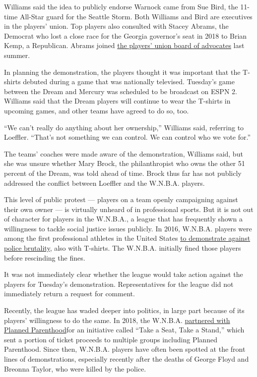 Williams said the idea to publicly endorse Warnock came from Sue Bird,
the 11-time All-Star guard for the Seattle Storm. Both Williams and Bird
are executives in the players' union. Top players also consulted with
Stacey Abrams, the Democrat who lost a close race for the Georgia
governor's seat in 2018 to Brian Kemp, a Republican. Abrams joined
\href{https://wnbpa.com/about/board/}{the players' union board of
advocates} last summer.

In planning the demonstration, the players thought it was important that
the T-shirts debuted during a game that was nationally televised.
Tuesday's game between the Dream and Mercury was scheduled to be
broadcast on ESPN 2. Williams said that the Dream players will continue
to wear the T-shirts in upcoming games, and other teams have agreed to
do so, too.

``We can't really do anything about her ownership,'' Williams said,
referring to Loeffler. ``That's not something we can control. We can
control who we vote for.''

The teams' coaches were made aware of the demonstration, Williams said,
but she was unsure whether Mary Brock, the philanthropist who owns the
other 51 percent of the Dream, was told ahead of time. Brock thus far
has not publicly addressed the conflict between Loeffler and the
W.N.B.A. players.

This level of public protest --- players on a team openly campaigning
against their own owner --- is virtually unheard of in professional
sports. But it is not out of character for players in the W.N.B.A., a
league that has frequently shown a willingness to tackle social justice
issues publicly. In 2016, W.N.B.A. players were among the first
professional athletes in the United States
\href{https://www.nytimes3xbfgragh.onion/2016/07/11/sports/basketball/liberty-show-solidarity-with-black-lives-matter-in-rare-public-stance.html}{to
demonstrate against police brutality}, also with T-shirts. The W.N.B.A.
initially fined those players before rescinding the fines.

It was not immediately clear whether the league would take action
against the players for Tuesday's demonstration. Representatives for the
league did not immediately return a request for comment.

Recently, the league has waded deeper into politics, in large part
because of its players' willingness to do the same. In 2018, the
W.N.B.A.
\href{https://www.wnba.com/news/wnba-take-a-seat-take-a-stand-women-girls-2018-season/}{partnered
with Planned Parenthood}for an initiative called ``Take a Seat, Take a
Stand,'' which sent a portion of ticket proceeds to multiple groups
including Planned Parenthood. Since then, W.N.B.A. players have often
been spotted at the front lines of demonstrations, especially recently
after the deaths of George Floyd and Breonna Taylor, who were killed by
the police.

